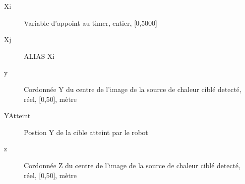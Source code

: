 \begin{description}
	\item [Xi]\el
	Variable d'appoint au timer, entier, [0,5000]

	\item [Xj]\el
	ALIAS Xi

	\item [y]\el
	Cordonnée Y du centre de l'image de la source de chaleur ciblé detecté, réel, [0,50], mètre

	\item [YAtteint]\el
	Postion Y de la cible atteint par le robot

	\item [z]\el
	Cordonnée Z du centre de l'image de la source de chaleur ciblé detecté, réel, [0,50], mètre

\end{description}

\vfill
\pagebreak
